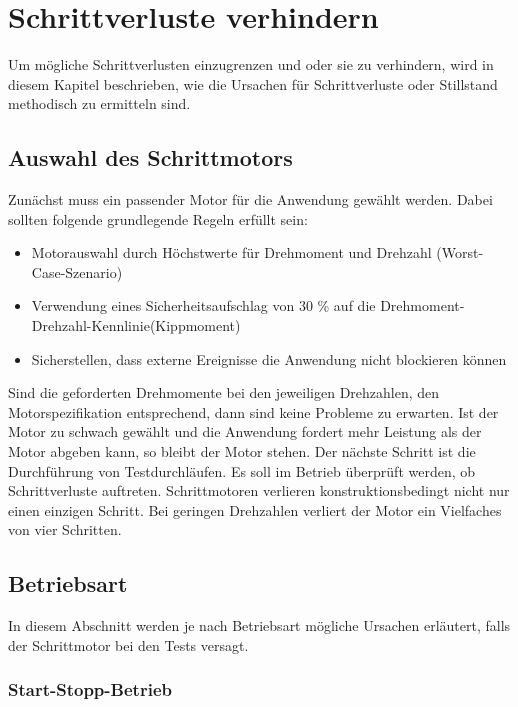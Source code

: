 \section{Schrittverluste verhindern}
Um mögliche Schrittverlusten einzugrenzen und oder sie zu verhindern, wird in diesem Kapitel beschrieben, wie die Ursachen für Schrittverluste oder Stillstand methodisch zu ermitteln sind. \cite{FaulhaberDriveSystems.2020}

\subsection{Auswahl des Schrittmotors}
Zunächst muss ein passender Motor für die Anwendung gewählt werden. Dabei sollten folgende grundlegende Regeln erfüllt sein:
\begin{itemize}
	\item Motorauswahl durch Höchstwerte für Drehmoment und Drehzahl (Worst-Case-Szenario)
	\item Verwendung eines Sicherheitsaufschlag von 30 \% auf die Drehmoment-Drehzahl-Kennlinie(Kippmoment)
	\item Sicherstellen, dass externe Ereignisse die Anwendung nicht blockieren können
\end{itemize}

Sind die geforderten Drehmomente bei den jeweiligen Drehzahlen, den Motorspezifikation entsprechend, dann sind keine Probleme zu erwarten. Ist der Motor zu schwach gewählt und die Anwendung fordert mehr Leistung als der Motor abgeben kann, so bleibt der Motor stehen. Der nächste Schritt ist die Durchführung von Testdurchläufen. Es soll im Betrieb überprüft werden, ob Schrittverluste auftreten. Schrittmotoren verlieren konstruktionsbedingt nicht nur einen einzigen Schritt. Bei geringen Drehzahlen verliert der Motor ein Vielfaches von vier Schritten.\cite{FaulhaberDriveSystems.2020}

\subsection{Betriebsart}

In diesem Abschnitt werden je nach Betriebsart mögliche Ursachen erläutert, falls der Schrittmotor bei den Tests versagt.

\subsubsection{Start-Stopp-Betrieb}


